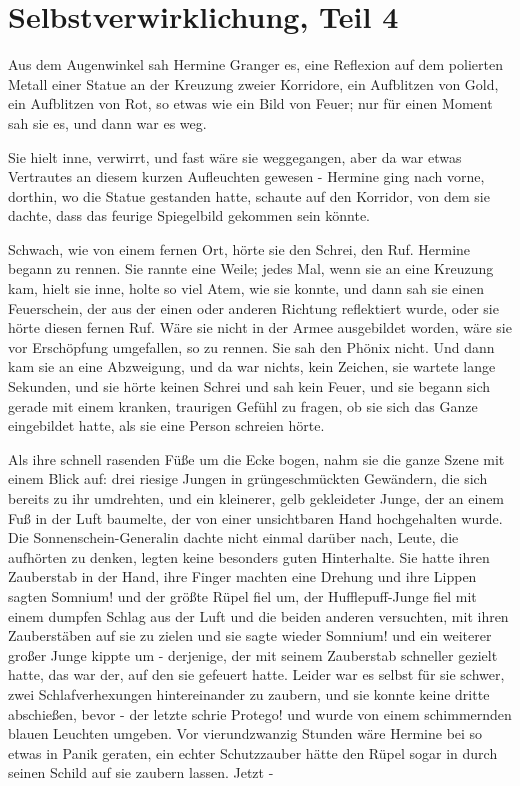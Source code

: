\chapter{Selbstverwirklichung, Teil 4}

Aus dem Augenwinkel sah Hermine Granger es, eine Reflexion auf dem polierten
Metall einer Statue an der Kreuzung zweier Korridore, ein Aufblitzen von Gold,
ein Aufblitzen von Rot, so etwas wie ein Bild von Feuer; nur für einen Moment
sah sie es, und dann war es weg.

Sie hielt inne, verwirrt, und fast wäre sie weggegangen, aber da war etwas
Vertrautes an diesem kurzen Aufleuchten gewesen - Hermine ging nach vorne,
dorthin, wo die Statue gestanden hatte, schaute auf den Korridor, von dem sie
dachte, dass das feurige Spiegelbild gekommen sein könnte.

Schwach, wie von einem fernen Ort, hörte sie den Schrei, den Ruf. Hermine begann
zu rennen. Sie rannte eine Weile; jedes Mal, wenn sie an eine Kreuzung kam,
hielt sie inne, holte so viel Atem, wie sie konnte, und dann sah sie einen
Feuerschein, der aus der einen oder anderen Richtung reflektiert wurde, oder sie
hörte diesen fernen Ruf. Wäre sie nicht in der Armee ausgebildet worden, wäre
sie vor Erschöpfung umgefallen, so zu rennen. Sie sah den Phönix nicht. Und dann
kam sie an eine Abzweigung, und da war nichts, kein Zeichen, sie wartete lange
Sekunden, und sie hörte keinen Schrei und sah kein Feuer, und sie begann sich
gerade mit einem kranken, traurigen Gefühl zu fragen, ob sie sich das Ganze
eingebildet hatte, als sie eine Person schreien hörte.

Als ihre schnell rasenden Füße um die Ecke bogen, nahm sie die ganze Szene mit
einem Blick auf: drei riesige Jungen in grüngeschmückten Gewändern, die sich
bereits zu ihr umdrehten, und ein kleinerer, gelb gekleideter Junge, der an
einem Fuß in der Luft baumelte, der von einer unsichtbaren Hand hochgehalten
wurde. Die Sonnenschein-Generalin dachte nicht einmal darüber nach, Leute, die
aufhörten zu denken, legten keine besonders guten Hinterhalte. Sie hatte ihren
Zauberstab in der Hand, ihre Finger machten eine Drehung und ihre Lippen sagten
\glqq Somnium!\grqq{} und der größte Rüpel fiel um, der Hufflepuff-Junge fiel
mit einem dumpfen Schlag aus der Luft und die beiden anderen versuchten, mit
ihren Zauberstäben auf sie zu zielen und sie sagte wieder \glqq Somnium!\grqq{}
und ein weiterer großer Junge kippte um - derjenige, der mit seinem Zauberstab
schneller gezielt hatte, das war der, auf den sie gefeuert hatte. Leider war es
selbst für sie schwer, zwei Schlafverhexungen hintereinander zu zaubern, und sie
konnte keine dritte abschießen, bevor - der letzte schrie \glqq Protego!\grqq{}
und wurde von einem schimmernden blauen Leuchten umgeben. Vor vierundzwanzig
Stunden wäre Hermine bei so etwas in Panik geraten, ein echter Schutzzauber
hätte den Rüpel sogar in durch seinen Schild auf sie zaubern lassen. Jetzt -

